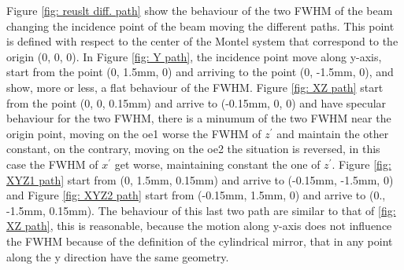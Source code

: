 Figure \ref{fig: reuslt diff. path} show the behaviour of the two FWHM of the beam changing the incidence point of the beam moving the different paths. This point is defined with respect to the center of the Montel system that correspond to the origin (0, 0, 0). In Figure \ref{fig: Y path}, the incidence point move along y-axis, start from the point (0, 1.5mm, 0) and arriving to the point (0, -1.5mm, 0), and show, more or less, a flat behaviour of the FWHM. Figure \ref{fig: XZ path} start from the point (0, 0, 0.15mm) and arrive to (-0.15mm, 0, 0) and have specular behaviour for the two FWHM, there is a minumum of the two FWHM near the origin point, moving on the oe1 worse the FWHM of $z^{'} $ and maintain the other constant, on the contrary, moving on the oe2 the situation is reversed, in this case the FWHM of $x^{'} $ get worse, maintaining constant the one of $z^{'} $. Figure \ref{fig: XYZ1 path} start from (0, 1.5mm, 0.15mm) and arrive to (-0.15mm, -1.5mm, 0) and Figure \ref{fig: XYZ2 path} start from (-0.15mm, 1.5mm, 0) and arrive to (0., -1.5mm, 0.15mm). The behaviour of this last two path are similar to that of \ref{fig: XZ path}, this is reasonable, because the motion along y-axis does not influence the FWHM because of the definition of the cylindrical mirror, that in any point along the y direction have the same geometry.


